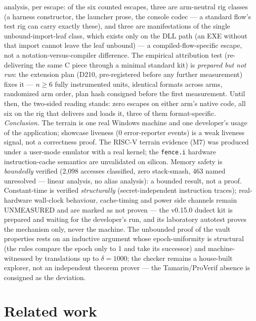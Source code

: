 \documentclass[11pt,a4paper]{article}
\newcommand{\code}[1]{\texttt{\small #1}}
\begin{document}
analysis, per escape: of the six counted escapes, three are
arm-neutral rig classes (a harness constructor, the launcher prose,
the console codec --- a standard flow's test rig can carry exactly
these), and three are manifestations of the single unbound-import-leaf
class, which exists only on the DLL path (an EXE without that import
cannot leave the leaf unbound) --- a compiled-flow-specific escape,
not a notation-versus-compiler difference. The empirical
attribution test (re-delivering the same C piece through a minimal
standard kit) is \emph{prepared but not run}: the extension plan
(D210, pre-registered before any further measurement) fixes it ---
$n \ge 6$ fully instrumented units, identical formats across arms,
randomized arm order, plan hash consigned before the first
measurement. Until then, the two-sided reading stands: zero escapes on
either arm's native code, all six on the rig that delivers and loads
it, three of them format-specific.
\emph{Conclusion.} The terrain is one real Windows machine and one
developer's usage of the application; showcase liveness (0 error-reporter
events) is a weak liveness signal, not a correctness proof. The RISC-V terrain
evidence (M7) was produced under a user-mode emulator with a real
kernel; the \code{fence.i} hardware instruction-cache semantics are
unvalidated on silicon. Memory safety
is \emph{boundedly} verified (2{,}098 accesses classified, zero
stack-smash, 463 named unresolved --- linear analysis, no alias
analysis): a bounded result, not a proof. Constant-time is verified
\emph{structurally} (secret-independent instruction traces); real-hardware
wall-clock behaviour, cache-timing and power side channels remain
UNMEASURED and are marked as not proven --- the v0.15.0 dudect kit is prepared
and waiting for the developer's run, and its laboratory autotest
proves the mechanism only, never the machine. The unbounded proof of
the vault properties rests on an inductive argument whose
epoch-uniformity is structural (the rules compare the epoch only to
1 and take its successor) and machine-witnessed by translations up
to $\delta = 1000$; the checker remains a house-built explorer, not
an independent theorem prover --- the Tamarin/ProVerif absence is
consigned as the deviation.

\section{Related work}\label{sec:related}
\end{document}
